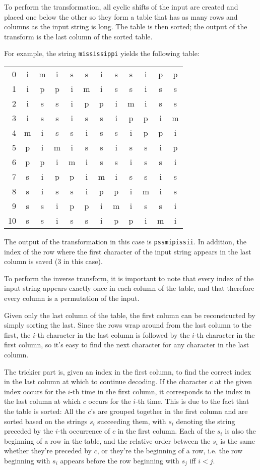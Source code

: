\documentclass[a4paper]{scrreprt}
\begin{document}
To perform the transformation, all cyclic shifts of the input are created and
placed one below the other so they form a table that has as many rows and
columns as the input string is long. The table is then sorted; the output of the
transform is the last column of the sorted table.

For example, the string \texttt{mississippi} yields the following table:

\begin{tabular}{|r||cccccccccc|c|}
\hline
0 & i & m & i & s & s & i & s & s & i & p & p \\
1 & i & p & p & i & m & i & s & s & i & s & s \\
2 & i & s & s & i & p & p & i & m & i & s & s \\
3 & i & s & s & i & s & s & i & p & p & i & m \\
4 & m & i & s & s & i & s & s & i & p & p & i \\
5 & p & i & m & i & s & s & i & s & s & i & p \\
6 & p & p & i & m & i & s & s & i & s & s & i \\
7 & s & i & p & p & i & m & i & s & s & i & s \\
8 & s & i & s & s & i & p & p & i & m & i & s \\
9 & s & s & i & p & p & i & m & i & s & s & i \\
10 & s & s & i & s & s & i & p & p & i & m & i \\
\hline
\end{tabular}

The output of the transformation in this case is \texttt{pssmipissii}. In
addition, the index of the row where the first character of the input string
appears in the last column is saved (3 in this case).

To perform the inverse transform, it is important to note that every index of
the input string appears exactly once in each column of the table, and that
therefore every column is a permutation of the input.

Given only the last column of the table, the first column can be reconstructed
by simply sorting the last. Since the rows wrap around from the last column to
the first, the \(i\)-th character in the last column is followed by the \(i\)-th
character in the first column, so it's easy to find the next character for any
character in the last column.

The trickier part is, given an index in the first column, to find the correct
index in the last column at which to continue decoding. If the character \(c\)
at the given index occurs for the \(i\)-th time in the first column, it
corresponds to the index in the last column at which \(c\) occurs for the
\(i\)-th time. This is due to the fact that the table is sorted: All the \(c\)'s
are grouped together in the first column and are sorted based on the strings
\(s_i\) succeeding them, with \(s_i\) denoting the string preceded by the
\(i\)-th occurrence of \(c\) in the first column. Each of the \(s_i\) is also
the beginning of a row in the table, and the relative order between the \(s_i\)
is the same whether they're preceded by \(c\), or they're the beginning of a
row, i.e. the row beginning with \(s_i\) appears before the row beginning with
\(s_j\) iff \(i<j\).
\end{document}
